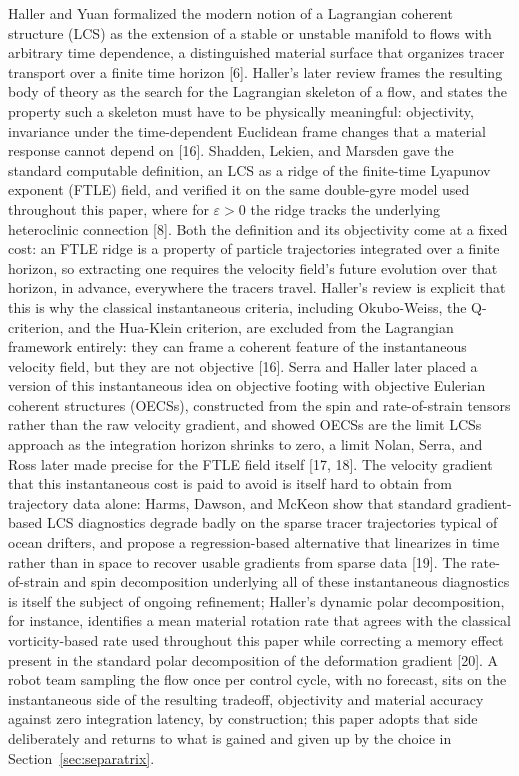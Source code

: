 \documentclass[lettersize,journal]{IEEEtran}
\begin{document}
Haller and Yuan formalized the modern notion of a Lagrangian coherent
structure (LCS) as the extension of a stable or unstable manifold to flows
with arbitrary time dependence, a distinguished material surface that
organizes tracer transport over a finite time horizon [6]. Haller's later
review frames the resulting body of theory as the search for the Lagrangian
skeleton of a flow, and states the property such a skeleton must have to be
physically meaningful: objectivity, invariance under the time-dependent
Euclidean frame changes that a material response cannot depend on [16].
Shadden, Lekien, and Marsden gave the standard computable definition, an LCS
as a ridge of the finite-time Lyapunov exponent (FTLE) field, and verified it
on the same double-gyre model used throughout this paper, where for
$\varepsilon > 0$ the ridge tracks the underlying heteroclinic connection
[8]. Both the definition and its objectivity come at a fixed cost: an FTLE
ridge is a property of particle trajectories integrated over a finite
horizon, so extracting one requires the velocity field's future evolution
over that horizon, in advance, everywhere the tracers travel. Haller's
review is explicit that this is why the classical instantaneous criteria,
including Okubo-Weiss, the Q-criterion, and the Hua-Klein criterion, are
excluded from the Lagrangian framework entirely: they can frame a coherent
feature of the instantaneous velocity field, but they are not objective
[16]. Serra and Haller later placed a version of this instantaneous idea on
objective footing with objective Eulerian coherent structures (OECSs),
constructed from the spin and rate-of-strain tensors rather than the raw
velocity gradient, and showed OECSs are the limit LCSs approach as the
integration horizon shrinks to zero, a limit Nolan, Serra, and Ross later
made precise for the FTLE field itself [17, 18]. The velocity gradient
that this instantaneous cost is paid to avoid is itself hard to obtain from
trajectory data alone: Harms, Dawson, and McKeon show that standard
gradient-based LCS diagnostics degrade badly on the sparse tracer
trajectories typical of ocean drifters, and propose a regression-based
alternative that linearizes in time rather than in space to recover usable
gradients from sparse data [19]. The rate-of-strain and spin decomposition
underlying all of these instantaneous diagnostics is itself the subject of
ongoing refinement; Haller's dynamic polar decomposition, for instance,
identifies a mean material rotation rate that agrees with the classical
vorticity-based rate used throughout this paper while correcting a
memory effect present in the standard polar decomposition of the
deformation gradient [20]. A robot team sampling the flow once per
control cycle, with no forecast, sits on the instantaneous side of the
resulting tradeoff, objectivity and material accuracy against zero
integration latency, by construction; this paper adopts that side
deliberately and returns to what is gained and given up by the choice in
Section~\ref{sec:separatrix}.
\end{document}
